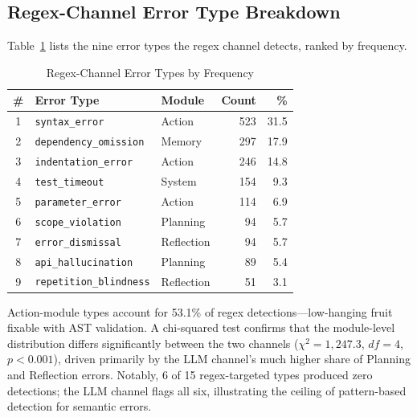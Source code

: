 \documentclass{ieeeaccess}
\begin{document}
\subsection{Regex-Channel Error Type Breakdown}

Table~\ref{tab:error_types} lists the nine error types the regex channel detects, ranked by frequency.

\begin{table}[h!]
\caption{Regex-Channel Error Types by Frequency}
\label{tab:error_types}
\centering
\setlength{\tabcolsep}{3pt}
\renewcommand{\arraystretch}{1.5}
\begin{tabularx}{\columnwidth}{|c|X|X|r|r|}
\hline
\textbf{\#} & \textbf{Error Type} & \textbf{Module} & \textbf{Count} & \textbf{\%} \\
\hline
1 & \texttt{syntax\_\allowbreak{}error}         & Action     & 523 & 31.5 \\
\hline
2 & \texttt{dependency\_\allowbreak{}omission}  & Memory     & 297 & 17.9 \\
\hline
3 & \texttt{indentation\_\allowbreak{}error}    & Action     & 246 & 14.8 \\
\hline
4 & \texttt{test\_\allowbreak{}timeout}         & System     & 154 &  9.3 \\
\hline
5 & \texttt{parameter\_\allowbreak{}error}      & Action     & 114 &  6.9 \\
\hline
6 & \texttt{scope\_\allowbreak{}violation}      & Planning   &  94 &  5.7 \\
\hline
7 & \texttt{error\_\allowbreak{}dismissal}      & Reflection &  94 &  5.7 \\
\hline
8 & \texttt{api\_\allowbreak{}hallucination}    & Planning   &  89 &  5.4 \\
\hline
9 & \texttt{repetition\_\allowbreak{}blindness} & Reflection &  51 &  3.1 \\
\hline
\end{tabularx}
\end{table}

Action-module types account for 53.1\% of regex detections---low-hanging fruit fixable with AST validation. A chi-squared test confirms that the module-level distribution differs significantly between the two channels ($\chi^2 = 1{,}247.3$, $df = 4$, $p < 0.001$), driven primarily by the LLM channel's much higher share of Planning and Reflection errors. Notably, 6 of 15 regex-targeted types produced zero detections; the LLM channel flags all six, illustrating the ceiling of pattern-based detection for semantic errors.
\end{document}
